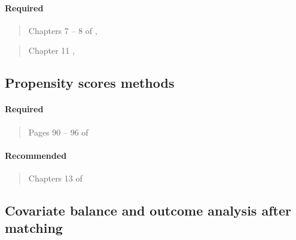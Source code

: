 \documentclass[12pt]{article}
\begin{document}
\paragraph*{Required}

\begin{verse}
  Chapters 7 -- 8 of , 
\end{verse}

\begin{verse}
  Chapter 11 , 
\end{verse}

\subsection{Propensity scores methods}

\paragraph*{Required}

\begin{verse} Pages 90 -- 96 of  \end{verse}

\begin{verse}
\end{verse}

\paragraph*{Recommended}

\begin{verse}
\end{verse}

\begin{verse}
\end{verse}


\begin{verse}
  Chapters 13 of 
\end{verse}

\begin{verse}
\end{verse}

\subsection{Covariate balance and outcome analysis after matching}
\end{document}
